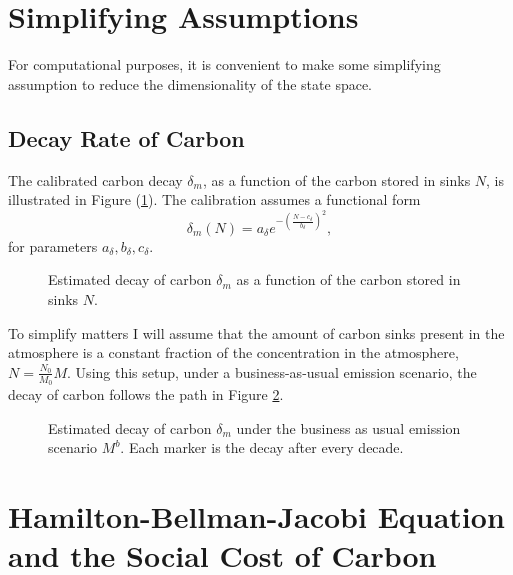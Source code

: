 \documentclass[../../main.tex]{subfiles}
\begin{document}
\section{Simplifying Assumptions} \label{appendix:assumptions}

For computational purposes, it is convenient to make some simplifying assumption to reduce the dimensionality of the state space.

\subsection{Decay Rate of Carbon}
 
The calibrated carbon decay $\delta_m$, as a function of the carbon stored in sinks $N$, is illustrated in Figure (\ref{fig:decay}). The calibration assumes a functional form \begin{equation}
    \delta_m(N) = a_{\delta} e^{-\left(\frac{N - c_{\delta}}{b_{\delta}}\right)^2},
\end{equation} for parameters $a_{\delta}, b_{\delta}, c_{\delta}$.

\begin{figure}[H]
    \centering
    
    \caption{Estimated decay of carbon $\delta_m$ as a  function of the carbon stored in sinks $N$.}
    \label{fig:decay}
\end{figure}

To simplify matters I will assume that the amount of carbon sinks present in the atmosphere is a constant fraction of the concentration in the atmosphere, $N = \frac{N_0}{M_0} M$. Using this setup, under a business-as-usual emission scenario, the decay of carbon follows the path in Figure \ref{fig:decaypath}.

\begin{figure}[H]
    \centering
    
    \caption{Estimated decay of carbon $\delta_m$ under the business as usual emission scenario $M^{b}$. Each marker is the decay after every decade.}
    \label{fig:decaypath}
\end{figure}

\iffalse
\section{Hamilton-Bellman-Jacobi Equation and the Social Cost of Carbon} \label{appendix:hjb}
\end{document}
